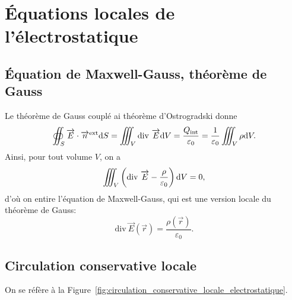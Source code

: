 \section{Équations locales de l'électrostatique}

    \subsection{Équation de Maxwell-Gauss, théorème de Gauss}

        Le théorème de Gauss couplé ai théorème d'Ostrogradski donne
        \begin{equation}
            \oiint_{S}\protect\overrightarrow{{E}}\cdot\protect\overrightarrow{{n}}^{\text{ext}}\mathrm{d} S=\iiint_{V}\mathrm{div}~\protect\overrightarrow{{E}}\mathrm{d} V=\frac{Q_{\text{int}}}{\varepsilon_0}=\frac{1}{\varepsilon_0}\iiint_{V}\rho\mathrm{d} V.
        \end{equation}
        Ainsi, pour tout volume $V$, on a 
        \begin{equation}
            \iiint_{V}\left(
                \mathrm{div}~\protect\overrightarrow{{E}}-\frac{\rho}{\varepsilon_0}
            \right)\mathrm{d} V=0,
        \end{equation}
        d'où on entire l'équation de Maxwell-Gauss, qui est une version locale du théorème de Gauss:
        \begin{equation}
            \boxed{
                \mathrm{div}~\vec{E}(\vec{r})=\frac{\rho(\vec{r})}{\varepsilon_0}.
            }
        \end{equation}

    \subsection{Circulation conservative locale}

        On se réfère à la Figure~\ref{fig:circulation_conservative_locale_electrostatique}.

